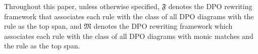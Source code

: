 


Throughout this paper, unless otherwise specified, 
\(\mathfrak{F}\) denotes the DPO rewriting framework that associates each rule with the class of all DPO diagrams with the rule as the top span, and \(\mathfrak{M}\) denotes the DPO rewriting framework which associates each rule with the class of all DPO diagrams with monic matches and the rule as the top span.